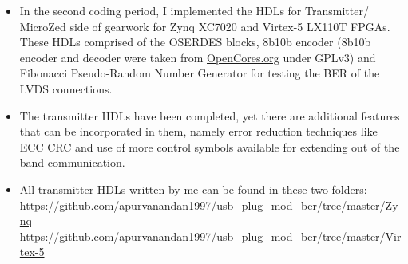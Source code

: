 \documentclass[11pt,oneside,fleqn]{book} %
\begin{document}
\begin{itemize}
\item In the second coding period, I implemented the HDLs for Transmitter/ MicroZed side of gearwork for Zynq XC7020 and Virtex-5 LX110T FPGAs. These HDLs comprised of the OSERDES blocks, 8b10b encoder (8b10b encoder and decoder were taken from \textcolor{blue}{\href{https://opencores.org/projects/8b10b_encdec}{OpenCores.org}} under GPLv3) and Fibonacci Pseudo-Random Number Generator for testing the BER of the LVDS connections.
\item The transmitter HDLs have been completed, yet there are additional features that can be incorporated in them, namely error reduction techniques like ECC CRC and use of more control symbols available for extending out of the band communication.
\item All transmitter HDLs written by me can be found in these two folders:\\
\textcolor{blue}{\url{https://github.com/apurvanandan1997/usb_plug_mod_ber/tree/master/Zynq}} \\
\textcolor{blue}{\url{https://github.com/apurvanandan1997/usb_plug_mod_ber/tree/master/Virtex-5}}
\end{itemize}
\end{document}

